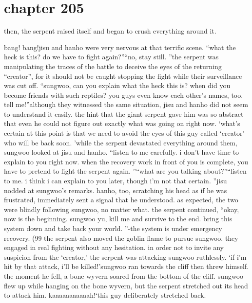 \section{chapter 205}

                            then, the serpent raised itself and began to crush everything around it.





bang! bang!jisu and hanho were very nervous at that terrific scene.
“what the heck is this? do we have to fight again?”“no, stay still.
”the serpent was manipulating the traces of the battle to deceive the eyes of the returning “creator”, for it should not be caught stopping the fight while their surveillance was cut off.
“sungwoo, can you explain what the heck this is? when did you become friends with such reptiles? you guys even know each other’s names, too.
 tell me!”although they witnessed the same situation, jisu and hanho did not seem to understand it easily.
 the hint that the giant serpent gave him was so abstract that even he could not figure out exactly what was going on right now.
‘what’s certain at this point is that we need to avoid the eyes of this guy called ‘creator’ who will be back soon.
’while the serpent devastated everything around them, sungwoo looked at jisu and hanho.
“listen to me carefully.
 i don’t have time to explain to you right now.
 when the recovery work in front of you is complete, you have to pretend to fight the serpent again.
”“what are you talking about?”“listen to me.
 i think i can explain to you later, though i’m not that certain.
”jisu nodded at sungwoo’s remarks.
 hanho, too, scratching his head as if he was frustrated, immediately sent a signal that he understood.
as expected, the two were blindly following sungwoo, no matter what.
the serpent continued, “okay, now is the beginning.
 sungwoo yu, kill me and survive to the end.
 bring this system down and take back your world.
”-the system is under emergency recovery.
 (99%
 the serpent also moved the goblin flame to pursue sungwoo.
 they engaged in real fighting without any hesitation.
in order not to invite any suspicion from the ‘creator,’ the serpent was attacking sungwoo ruthlessly.
‘if i’m hit by that attack, i’ll be killed!’sungwoo ran towards the cliff then threw himself.
the moment he fell, a bone wyvern soared from the bottom of the cliff.
 sungwoo flew up while hanging on the bone wyvern, but the serpent stretched out its head to attack him.
kaaaaaaaaaaah!‘this guy deliberately stretched back.
